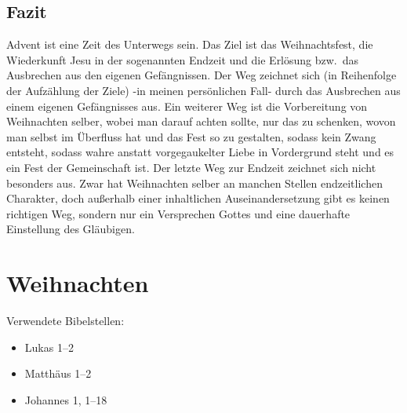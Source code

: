 \subsection{Fazit}
Advent ist eine Zeit des Unterwegs sein. Das Ziel ist das Weihnachtsfest, die Wiederkunft Jesu in der sogenannten Endzeit und die Erlösung bzw.\ das Ausbrechen aus den eigenen Gefängnissen. Der Weg zeichnet sich (in Reihenfolge der Aufzählung der Ziele) -in meinen persönlichen Fall- durch das Ausbrechen aus einem eigenen Gefängnisses aus. Ein weiterer Weg ist die Vorbereitung von Weihnachten selber, wobei man darauf achten sollte, nur das zu schenken, wovon man selbst im Überfluss hat und das Fest so zu gestalten, sodass kein Zwang entsteht, sodass wahre anstatt vorgegaukelter Liebe in Vordergrund steht und es ein Fest der Gemeinschaft ist. Der letzte Weg zur Endzeit zeichnet sich nicht besonders aus. Zwar hat Weihnachten selber an manchen Stellen endzeitlichen Charakter, doch außerhalb einer inhaltlichen Auseinandersetzung gibt es keinen richtigen Weg, sondern nur ein Versprechen Gottes und eine dauerhafte Einstellung des Gläubigen. 

\newpage
\section{Weihnachten}\label{sec:Weihnachten}
Verwendete Bibelstellen:
\begin{itemize}
\item Lukas 1--2
\item Matthäus 1--2
\item Johannes 1, 1--18
\end{itemize}

